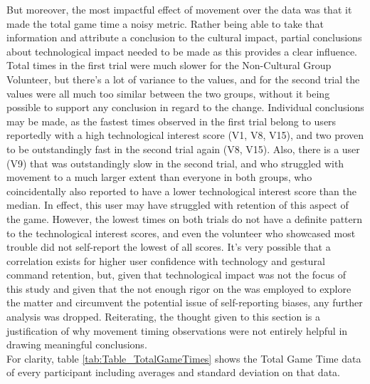     But moreover, the most impactful effect of movement over the data was that it made the total game time a noisy metric. Rather being able to take that information and attribute a conclusion to the cultural impact, partial conclusions about technological impact needed to be made as this provides a clear influence. Total times in the first trial were much slower for the Non-Cultural Group Volunteer, but there’s a lot of variance to the values, and for the second trial the values were all much too similar between the two groups, without it being possible to support any conclusion in regard to the change. Individual conclusions may be made, as the fastest times observed in the first trial belong to users reportedly with a high technological interest score (V1, V8, V15), and two proven to be outstandingly fast in the second trial again (V8, V15). Also, there is a user (V9) that was outstandingly slow in the second trial, and who struggled with movement to a much larger extent than everyone in both groups, who coincidentally also reported to have a lower technological interest score than the median. In effect, this user may have struggled with retention of this aspect of the game. However, the lowest times on both trials do not have a definite pattern to the technological interest scores, and even the volunteer who showcased most trouble did not self-report the lowest of all scores. It’s very possible that a correlation exists for higher user confidence with technology and gestural command retention, but, given that technological impact was not the focus of this study and given that the not enough rigor on the was employed to explore the matter and circumvent the potential issue of self-reporting biases, any further analysis was dropped. Reiterating, the thought given to this section is a justification of why movement timing observations were not entirely helpful in drawing meaningful conclusions.\\
    For clarity, table \ref{tab:Table_TotalGameTimes} shows the Total Game Time data of every participant including averages and standard deviation on that data.\\
    
